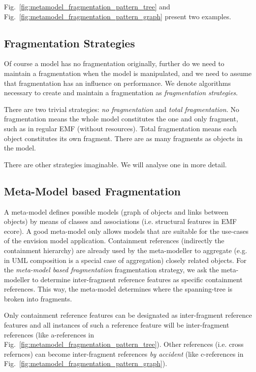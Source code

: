 Fig.~\ref{fig:metamodel_fragmentation_pattern_tree} and Fig.~\ref{fig:metamodel_fragmentation_pattern_graph} present two examples.

\subsection{Fragmentation Strategies}

Of course a model has no fragmentation originally, further do we need to maintain a fragmentation when the model is manipulated, and we need to assume that fragmentation has an influence on performance. We denote algorithms necessary to create and maintain a fragmentation as \emph{fragmentation strategies}.

There are two trivial strategies: \emph{no fragmentation} and \emph{total fragmentation}. No fragmentation means the whole model constitutes the one and only fragment, such as in regular EMF (without resources). Total fragmentation means each object constitutes its own fragment. There are as many fragments as objects in the model.

There are other strategies imaginable. We will analyse one in more detail. 

\subsection{Meta-Model based Fragmentation}

A meta-model defines possible models (graph of objects and links between objects) by means of classes and associations (i.e. structural features in EMF ecore). A good meta-model only allows models that are suitable for the use-cases of the envision model application. Containment references (indirectly the containment hierarchy) are already used by the meta-modeller to aggregate (e.g. in UML composition is a special case of aggregation) closely related objects. For the \emph{meta-model based fragmentation} fragmentation strategy, we ask the meta-modeller to determine inter-fragment reference features as specific containment references. This way, the meta-model determines where the spanning-tree is broken into fragments. 

Only containment reference features can be designated as inter-fragment reference features and all instances of such a reference feature will be inter-fragment references (like a-references in Fig.~\ref{fig:metamodel_fragmentation_pattern_tree}). Other references (i.e. cross refernces) can become inter-fragment references \emph{by accident} (like c-references in Fig.~\ref{fig:metamodel_fragmentation_pattern_graph}).

